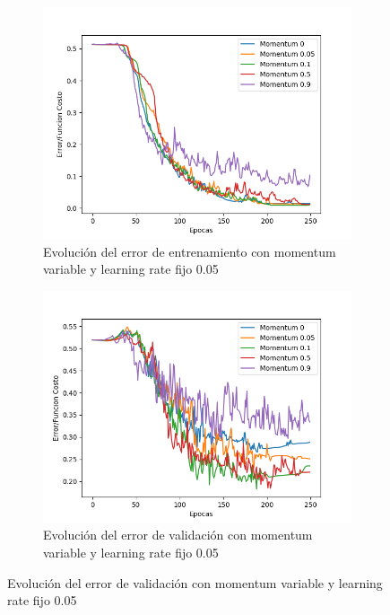 \begin{figure}[!htbp]
\centering
\begin{subfigure}{.5\textwidth}
  \centering
  \includegraphics[width=1\linewidth]{graficos/eta_x_momentum_promedios_entrenamiento_1.png}
  \caption{Evolución del error de entrenamiento con momentum variable y learning rate fijo 0.05}
  \label{fig:sub1}
\end{subfigure}%
\begin{subfigure}{.5\textwidth}
  \centering
  \includegraphics[width=1\linewidth]{graficos/eta_x_momentum_promedios_validacion_1.png}
  \caption{Evolución del error de validación con momentum variable y learning rate fijo 0.05}
  \label{fig:sub2}
\end{subfigure}
\end{figure}

